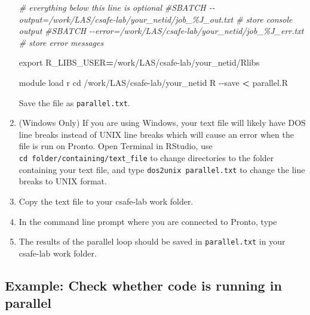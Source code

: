 \documentclass[
]{book}
\newenvironment{Shaded}{\begin{snugshade}}{\end{snugshade}}
\newcommand{\AttributeTok}[1]{\textcolor[rgb]{0.77,0.63,0.00}{#1}}
\newcommand{\BuiltInTok}[1]{#1}
\newcommand{\CommentTok}[1]{\textcolor[rgb]{0.56,0.35,0.01}{\textit{#1}}}
\newcommand{\ExtensionTok}[1]{#1}
\newcommand{\NormalTok}[1]{#1}
\newcommand{\OperatorTok}[1]{\textcolor[rgb]{0.81,0.36,0.00}{\textbf{#1}}}
\newcommand{\VariableTok}[1]{\textcolor[rgb]{0.00,0.00,0.00}{#1}}
\begin{document}
\begin{enumerate}
\begin{Shaded}
\begin{Highlighting}[]
\CommentTok{\# everything below this line is optional}
\CommentTok{\#SBATCH {-}{-}output=/work/LAS/csafe{-}lab/your\_netid/job\_\%J\_out.txt \# store console output}
\CommentTok{\#SBATCH {-}{-}error=/work/LAS/csafe{-}lab/your\_netid/job\_\%J\_err.txt \# store error messages}

\BuiltInTok{export} \VariableTok{R\_LIBS\_USER}\OperatorTok{=}\NormalTok{/work/LAS/csafe{-}lab/your\_netid/Rlibs}

\ExtensionTok{module}\NormalTok{ load r}
\BuiltInTok{cd}\NormalTok{ /work/LAS/csafe{-}lab/your\_netid}
\ExtensionTok{R} \AttributeTok{{-}{-}save} \OperatorTok{\textless{}}\NormalTok{ parallel.R}
\end{Highlighting}
\end{Shaded}

  Save the file as \texttt{parallel.txt}.
\item
  (Windows Only) If you are using Windows, your text file will likely have DOS line breaks instead of UNIX line breaks which will cause an error when the file is run on Pronto. Open Terminal in RStudio, use \texttt{cd\ folder/containing/text\_file} to change directories to the folder containing your text file, and type \texttt{dos2unix\ parallel.txt} to change the line breaks to UNIX format.
\item
  Copy the text file to your csafe-lab work folder.
\item
  In the command line prompt where you are connected to Pronto, type

\begin{Shaded}
\end{Shaded}
\item
  The results of the parallel loop should be saved in \texttt{parallel.txt} in your csafe-lab work folder.
\end{enumerate}

\hypertarget{ex-check-parallel}{%
\subsection{Example: Check whether code is running in parallel}\label{ex-check-parallel}}
\end{document}
